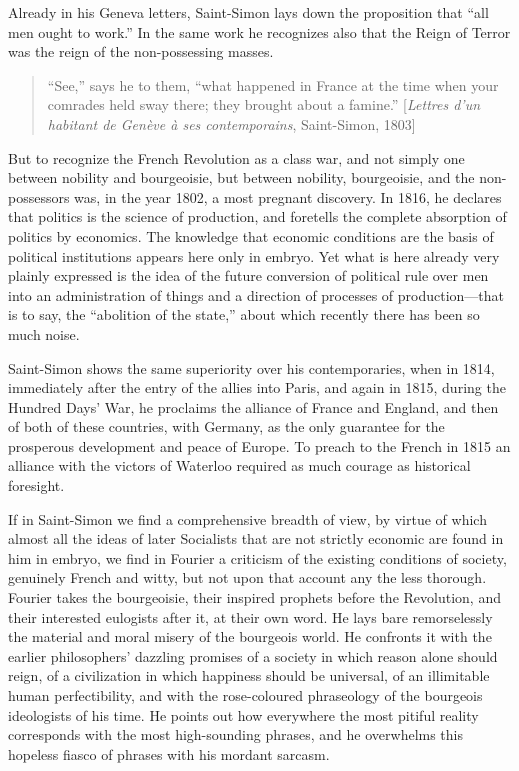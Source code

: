 Already in his Geneva letters, Saint-Simon lays down the proposition that ``all
men ought to work.'' In the same work he recognizes also that the Reign of
Terror was the reign of the non-possessing masses.
%
\begin{quote}
  ``See,'' says he to them, ``what happened in France at the time when your
  comrades held sway there; they brought about a famine.'' [\emph{Lettres d’un
  habitant de Genève à ses contemporains}, Saint-Simon, 1803]
\end{quote}
%
But to recognize the French Revolution as a class war, and not simply one
between nobility and bourgeoisie, but between nobility, bourgeoisie, and the
non-possessors was, in the year 1802, a most pregnant discovery. In 1816, he
declares that politics is the science of production, and foretells the complete
absorption of politics by economics. The knowledge that economic conditions are
the basis of political institutions appears here only in embryo. Yet what is
here already very plainly expressed is the idea of the future conversion of
political rule over men into an administration of things and a direction of
processes of production---that is to say, the ``abolition of the state,'' about
which recently there has been so much noise.

Saint-Simon shows the same superiority over his contemporaries, when in 1814,
immediately after the entry of the allies into Paris, and again in 1815, during
the Hundred Days' War, he proclaims the alliance of France and England, and then
of both of these countries, with Germany, as the only guarantee for the
prosperous development and peace of Europe. To preach to the French in 1815 an
alliance with the victors of Waterloo required as much courage as historical
foresight.

If in Saint-Simon we find a comprehensive breadth of view, by virtue of which
almost all the ideas of later Socialists that are not strictly economic are
found in him in embryo, we find in Fourier a criticism of the existing
conditions of society, genuinely French and witty, but not upon that account any
the less thorough. Fourier takes the bourgeoisie, their inspired prophets before
the Revolution, and their interested eulogists after it, at their own word. He
lays bare remorselessly the material and moral misery of the bourgeois world. He
confronts it with the earlier philosophers' dazzling promises of a society in
which reason alone should reign, of a civilization in which happiness should be
universal, of an illimitable human perfectibility, and with the rose-coloured
phraseology of the bourgeois ideologists of his time. He points out how
everywhere the most pitiful reality corresponds with the most high-sounding
phrases, and he overwhelms this hopeless fiasco of phrases with his mordant
sarcasm.

